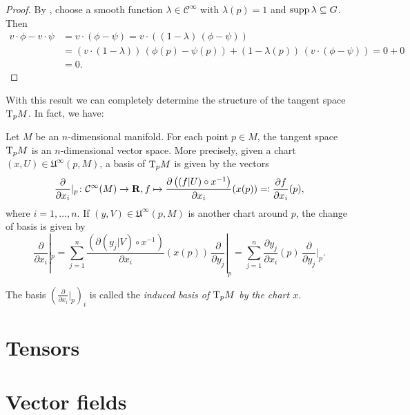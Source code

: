 \begin{proof}
  By , choose a smooth function $\lambda \in
  \mathcal C^\infty$ with $\lambda(p) = 1$ and $\operatorname{supp} \lambda \subseteq G$. Then
  \[
    \begin{split}
      v \cdot \phi - v \cdot \psi
      & = v \cdot (\phi - \psi) = v \cdot \left((1 - \lambda) \, (\phi - \psi)\right) \\
      & = \left(v \cdot (1 - \lambda)\right) \, (\phi(p) - \psi(p))
      + (1 - \lambda(p)) \, \left(v \cdot (\phi - \psi)\right) = 0 + 0 \\
      & = 0.
    \end{split}
  \]
\end{proof}

With this result we can completely determine the structure of the tangent space
$\mathrm T_p M$. In fact, we have:

\begin{thm}
  Let $M$ be an $n$-dimensional manifold. For each point $p \in M$, the tangent
  space $\mathrm T_p M$ is an $n$-dimensional vector space. More precisely, given
  a chart $(x, U) \in \mathfrak U^\infty(p, M)$, a basis of $\mathrm T_p M$ is given
  by the vectors
  \[
    \frac{\partial}{\partial x_i}|_p\colon \mathcal C^\infty(M)
    \to \mathbf{R}, f \mapsto \frac{\partial \left((f|U) \circ x^{-1}\right)}{\partial x_i}(x(p))
    \eqqcolon \frac{\partial f}{\partial x_i}(p),  
  \]
  where $i = 1, \dotsc, n$. If $(y, V) \in \mathfrak U^\infty(p, M)$ is another
  chart around $p$, the change of basis is given by
  \[
    \frac{\partial}{\partial x_i}|_p =
    \sum_{j = 1}^n \frac{\left(\partial (y_j|V) \circ x^{-1}\right)}{\partial x_i}(x(p))
    \, \frac{\partial}{\partial y_j}|_p
    =
    \sum_{j = 1}^n \frac{\partial y_j}{\partial x_i}(p) \, 
    \frac{\partial}{\partial y_j}|_p.
  \]  
\end{thm}
The basis $(\frac{\partial}{\partial x_i}|_p)_i$ is called the
\emph{induced basis of $\mathrm T_p M$ by the chart $x$}.



\section{Tensors}

\section{Vector fields}

